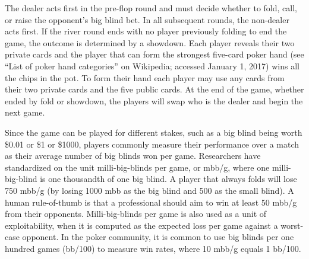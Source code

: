 The dealer acts first in the pre-flop round and must decide whether to fold, call, or raise the opponent's big blind bet.  In all subsequent rounds, the non-dealer acts first.
If the river round ends with no player previously folding to end the game, the outcome is
determined by a showdown. Each player reveals their two private cards and the player that can
form the strongest five-card poker hand (see ``List of poker hand categories'' on Wikipedia; accessed January
1, 2017) wins all the chips in the pot. To form their hand each player may use any cards from
their two private cards and the five public cards. At the end of the game, whether ended by
fold or showdown, the players will swap who is the dealer and begin the next game.

Since the game can be played for different stakes, such as a big blind being worth \$0.01
or \$1 or \$1000, players commonly measure their performance over a match as their average
number of big blinds won per game. Researchers have standardized on the unit milli-big-blinds
per game, or mbb/g, where one milli-big-blind is one thousandth of one big blind. A player that always
folds will lose 750 mbb/g (by losing 1000 mbb as the big blind and 500 as the small blind).
A human rule-of-thumb is that a professional should aim to win at least 50 mbb/g from their
opponents. Milli-big-blinds per game is also used as a unit of exploitability, when it is computed
as the expected loss per game against a worst-case opponent.  In the poker community, it is common to use big blinds per one hundred games (bb/100) to measure win rates, where 10 mbb/g equals 1 bb/100.

